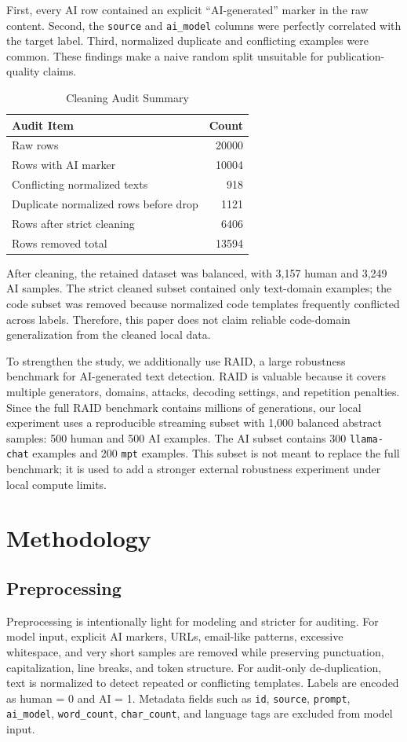 \documentclass[conference]{IEEEtran}
\begin{document}
First, every AI row contained an explicit ``AI-generated'' marker in the raw content. Second, the \texttt{source} and \texttt{ai\_model} columns were perfectly correlated with the target label. Third, normalized duplicate and conflicting examples were common. These findings make a naive random split unsuitable for publication-quality claims.

\begin{table}[htbp]
\caption{Cleaning Audit Summary}
\centering
\begin{tabular}{lr}
\toprule
Audit Item & Count \\
\midrule
Raw rows & 20000 \\
Rows with AI marker & 10004 \\
Conflicting normalized texts & 918 \\
Duplicate normalized rows before drop & 1121 \\
Rows after strict cleaning & 6406 \\
Rows removed total & 13594 \\
\bottomrule
\end{tabular}
\label{tab:cleaning}
\end{table}

After cleaning, the retained dataset was balanced, with 3,157 human and 3,249 AI samples. The strict cleaned subset contained only text-domain examples; the code subset was removed because normalized code templates frequently conflicted across labels. Therefore, this paper does not claim reliable code-domain generalization from the cleaned local data.

To strengthen the study, we additionally use RAID, a large robustness benchmark for AI-generated text detection. RAID is valuable because it covers multiple generators, domains, attacks, decoding settings, and repetition penalties. Since the full RAID benchmark contains millions of generations, our local experiment uses a reproducible streaming subset with 1,000 balanced abstract samples: 500 human and 500 AI examples. The AI subset contains 300 \texttt{llama-chat} examples and 200 \texttt{mpt} examples. This subset is not meant to replace the full benchmark; it is used to add a stronger external robustness experiment under local compute limits.

\section{Methodology}
\subsection{Preprocessing}
Preprocessing is intentionally light for modeling and stricter for auditing. For model input, explicit AI markers, URLs, email-like patterns, excessive whitespace, and very short samples are removed while preserving punctuation, capitalization, line breaks, and token structure. For audit-only de-duplication, text is normalized to detect repeated or conflicting templates. Labels are encoded as human = 0 and AI = 1. Metadata fields such as \texttt{id}, \texttt{source}, \texttt{prompt}, \texttt{ai\_model}, \texttt{word\_count}, \texttt{char\_count}, and language tags are excluded from model input.
\end{document}
